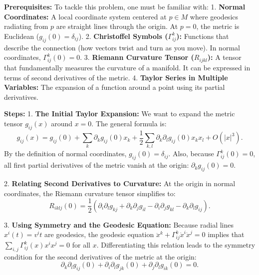 \begin{solution}
\textbf{Prerequisites:}
To tackle this problem, one must be familiar with:
1. \textbf{Normal Coordinates:} A local coordinate system centered at $p \in M$ where geodesics radiating from $p$ are straight lines through the origin. At $p=0$, the metric is Euclidean ($g_{ij}(0) = \delta_{ij}$).
2. \textbf{Christoffel Symbols ($\Gamma^k_{ij}$):} Functions that describe the connection (how vectors twist and turn as you move). In normal coordinates, $\Gamma^k_{ij}(0) = 0$.
3. \textbf{Riemann Curvature Tensor ($R_{ijkl}$):} A tensor that fundamentally measures the curvature of a manifold. It can be expressed in terms of second derivatives of the metric.
4. \textbf{Taylor Series in Multiple Variables:} The expansion of a function around a point using its partial derivatives.
\par\vspace{\baselineskip}

\textbf{Steps:}
1. \textbf{The Initial Taylor Expansion:}
We want to expand the metric tensor $g_{ij}(x)$ around $x=0$. The general formula is:
\[ g_{ij}(x) = g_{ij}(0) + \sum_k \partial_k g_{ij}(0) x_k + \frac{1}{2}\sum_{k,l} \partial_k \partial_l g_{ij}(0) x_k x_l + O(|x|^3). \]
By the definition of normal coordinates, $g_{ij}(0) = \delta_{ij}$. Also, because $\Gamma^k_{ij}(0) = 0$, all first partial derivatives of the metric vanish at the origin: $\partial_k g_{ij}(0) = 0$.
\par\vspace{\baselineskip}

2. \textbf{Relating Second Derivatives to Curvature:}
At the origin in normal coordinates, the Riemann curvature tensor simplifies to:
\[ R_{iklj}(0) = \frac{1}{2}(\partial_i \partial_l g_{kj} + \partial_k \partial_j g_{il} - \partial_i \partial_j g_{kl} - \partial_k \partial_l g_{ij}). \]
\par\vspace{\baselineskip}

3. \textbf{Using Symmetry and the Geodesic Equation:}
Because radial lines $x^i(t) = v^i t$ are geodesics, the geodesic equation $\ddot{x}^k + \Gamma^k_{ij}\dot{x}^i\dot{x}^j = 0$ implies that $\sum_{i,j} \Gamma^k_{ij}(x) x^i x^j = 0$ for all $x$. Differentiating this relation leads to the symmetry condition for the second derivatives of the metric at the origin:
\[ \partial_k \partial_l g_{ij}(0) + \partial_i \partial_l g_{jk}(0) + \partial_j \partial_l g_{ik}(0) = 0. \]
\par\vspace{\baselineskip}


\end{solution}
